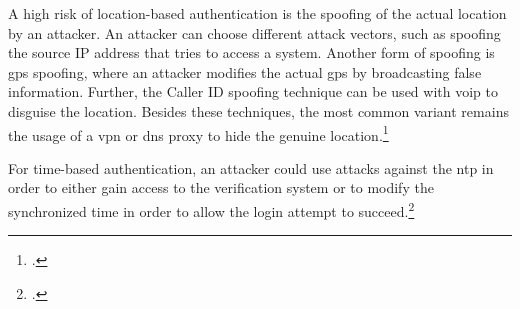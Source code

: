 A high risk of location-based authentication is the spoofing of the actual location by an attacker. An attacker can choose different attack vectors, such as spoofing the source IP address that tries to access a system. Another form of spoofing is \gls{gps} spoofing, where an attacker modifies the actual \gls{gps} by broadcasting false information. Further, the Caller ID spoofing technique can be used with \gls{voip} to disguise the location. Besides these techniques, the most common variant remains the usage of a \gls{vpn} or \gls{dns} proxy to hide the genuine location.\footcites[See][138--145]{517355}[See][Chapter 4.5.3]{30270}[See][115--116,133]{eckert-it-sec-9}

For time-based authentication, an attacker could use attacks against the \gls{ntp} in order to either gain access to the verification system or to modify the synchronized time in order to allow the login attempt to succeed.\footcite[See][]{malhotraattacking}
